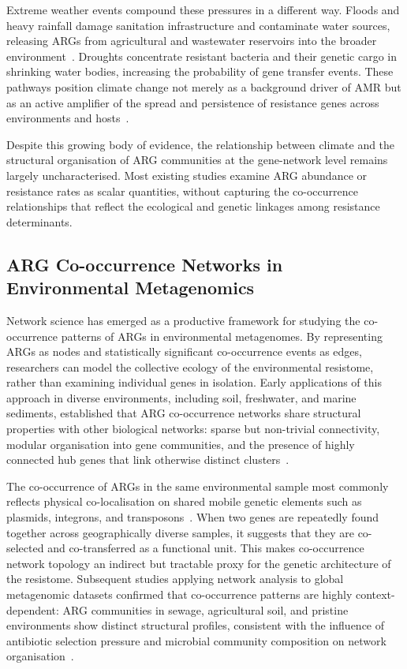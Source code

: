 \documentclass[12pt,a4paper]{article}
\begin{document}
Extreme weather events compound these pressures in a different way.
Floods and heavy rainfall damage sanitation infrastructure and contaminate
water sources, releasing ARGs from agricultural and wastewater reservoirs
into the broader environment~\cite{LancetWP2025}.
Droughts concentrate resistant bacteria and their genetic cargo in
shrinking water bodies, increasing the probability of gene transfer events.
These pathways position climate change not merely as a background driver
of AMR but as an active amplifier of the spread and persistence of
resistance genes across environments and hosts~\cite{Cavicchioli2019}.

Despite this growing body of evidence, the relationship between climate
and the structural organisation of ARG communities at the gene-network
level remains largely uncharacterised.
Most existing studies examine ARG abundance or resistance rates as scalar
quantities, without capturing the co-occurrence relationships that reflect
the ecological and genetic linkages among resistance determinants.


\subsection{ARG Co-occurrence Networks in Environmental Metagenomics}

Network science has emerged as a productive framework for studying
the co-occurrence patterns of ARGs in environmental metagenomes.
By representing ARGs as nodes and statistically significant co-occurrence
events as edges, researchers can model the collective ecology of the
environmental resistome, rather than examining individual genes in
isolation.
Early applications of this approach in diverse environments, including
soil, freshwater, and marine sediments, established that ARG co-occurrence
networks share structural properties with other biological networks:
sparse but non-trivial connectivity, modular organisation into gene
communities, and the presence of highly connected hub genes that link
otherwise distinct clusters~\cite{ZhuChen2013}.

The co-occurrence of ARGs in the same environmental sample most commonly
reflects physical co-localisation on shared mobile genetic elements such
as plasmids, integrons, and transposons~\cite{Partridge2018}.
When two genes are repeatedly found together across geographically diverse
samples, it suggests that they are co-selected and co-transferred as a
functional unit.
This makes co-occurrence network topology an indirect but tractable proxy
for the genetic architecture of the resistome.
Subsequent studies applying network analysis to global metagenomic datasets
confirmed that co-occurrence patterns are highly context-dependent:
ARG communities in sewage, agricultural soil, and pristine environments
show distinct structural profiles, consistent with the influence of
antibiotic selection pressure and microbial community composition on
network organisation~\cite{Martiny2022}.
\end{document}
